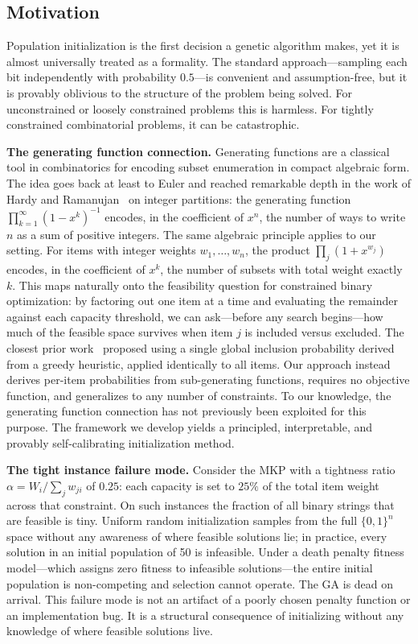 \documentclass[twocolumn]{article}
\begin{document}
\subsection{Motivation}

Population initialization is the first decision a genetic algorithm makes, 
yet it is almost universally treated as a formality. The standard approach---sampling 
each bit independently with probability $0.5$---is convenient and assumption-free, 
but it is provably oblivious to the structure of the problem being solved. 
For unconstrained or loosely constrained problems this is harmless. For 
tightly constrained combinatorial problems, it can be catastrophic.

\textbf{The generating function connection.}
Generating functions are a classical tool in combinatorics for encoding 
subset enumeration in compact algebraic form. The idea goes back at least 
to Euler and reached remarkable depth in the work of Hardy and 
Ramanujan~\cite{hardyramanujan1918} on integer partitions: the generating 
function $\prod_{k=1}^{\infty}(1-x^k)^{-1}$ encodes, in the coefficient of 
$x^n$, the number of ways to write $n$ as a sum of positive integers. 
The same algebraic principle applies to our setting. For items with integer 
weights $w_1, \ldots, w_n$, the product $\prod_j (1 + x^{w_j})$ encodes, 
in the coefficient of $x^k$, the number of subsets with total weight 
exactly $k$. This maps naturally onto the feasibility question for 
constrained binary optimization: by factoring out one item at a time and 
evaluating the remainder against each capacity threshold, we can 
ask---before any search begins---how much of the feasible space survives 
when item $j$ is included versus excluded. The closest prior work~\cite{hill1999monte,hill2005improving} 
proposed using a single global inclusion probability derived from a greedy 
heuristic, applied identically to all items. Our approach instead derives 
per-item probabilities from sub-generating functions, requires no objective 
function, and generalizes to any number of constraints. To our knowledge, 
the generating function connection has not previously been exploited for 
this purpose. The framework we develop yields a principled, interpretable, 
and provably self-calibrating initialization method.

\textbf{The tight instance failure mode.}
Consider the MKP with a tightness ratio $\alpha = W_i / \sum_j w_{ji}$ of 
$0.25$: each capacity is set to $25\%$ of the total item weight across 
that constraint. On such instances the fraction of all binary strings that 
are feasible is tiny. Uniform random initialization samples from the full 
$\{0,1\}^n$ space without any awareness of where feasible solutions lie; 
in practice, every solution in an initial population of 50 is infeasible. 
Under a death penalty fitness model---which assigns zero fitness to 
infeasible solutions---the entire initial population is non-competing and 
selection cannot operate. The GA is dead on arrival. This failure mode is 
not an artifact of a poorly chosen penalty function or an implementation 
bug. It is a structural consequence of initializing without any knowledge 
of where feasible solutions live.
\end{document}
